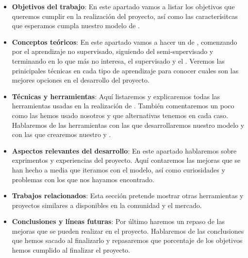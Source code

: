 \begin{itemize}
  \item \textbf{Objetivos del trabajo}: En este apartado vamos a listar los objetivos que queremos cumplir en la realización del proyecto, así como las caracterísitcas que esperamos cumpla nuestro modelo de .
  \item \textbf{Conceptos teóricos}: En este apartado vamos a hacer un  de , comenzando por el aprendizaje no supervisado, siguiendo del semi-supervisado y terminando en lo que más no interesa, el supervisado y el . Veremos las prinicipales técnicas en cada tipo de aprendizaje para conocer cuales son las mejores opciones en el desarrollo del proyecto.
  \item \textbf{Técnicas y herramientas}: Aquí listaremos y explicaremos todas las herramientas usadas en la realización de . También comentaremos un poco como las hemos usado nosotros y que alternativas tenemos en cada caso. Hablaremos de las herramientas con las que desarrollaremos nuestro modelo y con las que crearemos nuestro  y .
  \item \textbf{Aspectos relevantes del desarrollo}: En este apartado hablaremos sobre exprimentos y experiencias del proyecto. Aquí contaremos las mejoras que se han hecho a media que iteramos con el modelo, así como curiosidades y problemas con los que nos hayamos encontrado.
  \item \textbf{Trabajos relacionados}: Esta sección pretende mostrar otras herramientas y proyectos similares a  disponibles en la comunidad y el mercado.
  \item \textbf{Conclusiones y líneas futuras}: Por último haremos un repaso de las mejoras que se pueden realizar en el proyecto. Hablaremos de las conclusiones que hemos sacado al finalizarlo y repasaremos que porcentaje de los objetivos hemos cumplido al finalizar el proyecto.
\end{itemize}